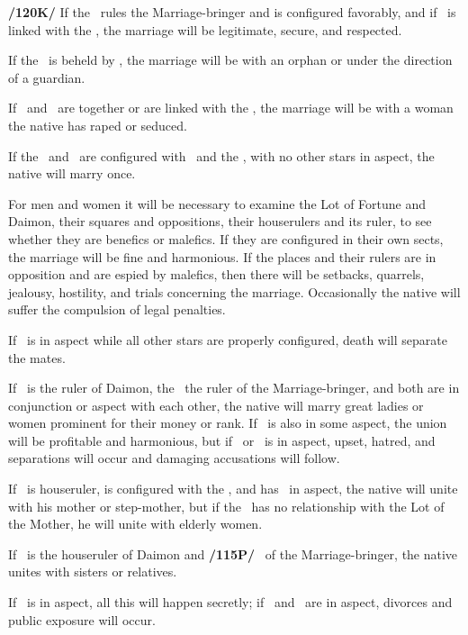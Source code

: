 \textbf{/120K/} If the \Sun\, rules the Marriage-bringer and is configured favorably, and if \Jupiter\, is linked with the \Moon, the marriage will be legitimate, secure, and respected. 

If the \Moon\, is beheld by \Saturn, the marriage will be with an orphan or under the direction of a guardian. 

If \Venus\, and \Mars\, are together or are linked with the \Moon, the marriage will be with a woman the native has raped or seduced. 

If the \Moon\, and \Venus\, are configured with \Jupiter\, and the \Sun, with no other stars in aspect, the native will marry once.

For men and women it will be necessary to examine the Lot of Fortune and Daimon, their squares and oppositions, their houserulers and its ruler, to see whether they are benefics or malefics. If they are configured in their own sects, the marriage will be fine and harmonious. If the places and their rulers are in opposition and are espied by malefics, then there will be setbacks, quarrels, jealousy, hostility, and trials concerning the marriage. Occasionally the native will suffer the compulsion of legal penalties. 

If \Saturn\, is in aspect while all other stars are properly configured, death will separate the mates. 

If \Mercury\, is the ruler of Daimon, the \Moon\, the ruler of the Marriage-bringer, and both are in conjunction or aspect with each other, the native will marry great ladies or women prominent for their money or rank. If \Jupiter\, is also in some aspect, the union will be profitable and harmonious, but if \Saturn\, or \Mars\, is in aspect, upset, hatred, and separations will occur and damaging accusations will follow. 

If \Jupiter\, is houseruler, is configured with the \Moon, and has \Saturn\, in aspect, the native will unite with his mother or step-mother, but if the \Moon\, has no relationship with the Lot of the Mother, he will unite with elderly women. 

If \Jupiter\, is the houseruler of Daimon and \textbf{/115P/} \Venus\, of the Marriage-bringer, the native unites with sisters or relatives.

If \Saturn\, is in aspect, all this will happen secretly; if \Mercury\, and \Mars\, are in aspect, divorces and public exposure will occur. 

